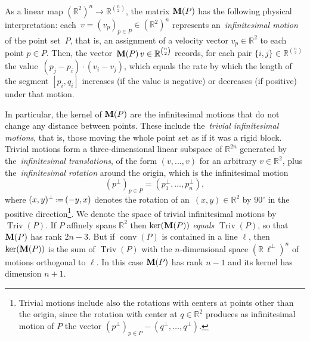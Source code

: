 \documentclass{amsart}
\theoremstyle{definition}
\newcommand{\R}{\mathbb{R}} %
\renewcommand{\b}[1]{{\boldsymbol{#1}}} %
\newcommand{\eqdef}{\mbox{\,\raisebox{0.2ex}{\scriptsize\ensuremath{\mathrm:}}\ensuremath{=}\,}} %
\DeclareMathOperator{\conv}{conv} %
\newcommand{\darkblue}{\color{darkblue}} %
\newcommand{\defn}[1]{\textsl{\darkblue #1}} %
\newcommand{\Mmatrix}{\b{\rm M}} %
\newcommand{\Triv}{\operatorname{Triv} } %
\begin{document}
As a linear map $(\R^2)^n\to \R^{\binom{n}{2}}$, the matrix $\Mmatrix(P)$ has the following physical interpretation: each~${v = (v_p)_{p\in P} \in (\R^2)^n}$ represents an~\defn{infinitesimal motion} of the point set~\(P\), that is, an assignment of a velocity vector \(v_p \in \R^2\) to each point \(p \in P\). Then, the vector~$\Mmatrix(P)\, v \in \R^{\binom{n}{2}}$ records, for each pair $\{i,j\} \in \R^{\binom{n}{2}}$ the value~$(p_j-p_i)\cdot (v_i-v_j)$, which equals the rate by which the length of the segment $[p_i,q_i]$ increases (if the value is negative) or decreases (if positive) under that motion.

In particular, the kernel of $\Mmatrix(P)$ are the infinitesimal motions that do not change any distance between points. 
These include the~\defn{trivial infinitesimal motions}, that is, those moving the whole point set as if it was a rigid block. Trivial motions form a three-dimensional linear subspace of $\R^{2n}$ generated by the~\defn{infinitesimal translations}, of the form $(v,...,v)$ for an arbitrary $v\in \R^2$, plus the~\defn{infinitesimal rotation} around the origin, which is the infinitesimal motion
\[
(p^\perp)_{p\in P} = (p_1^\perp, \dots, p_n^\perp),
\]
where $(x,y)^\perp\eqdef(-y,x)$ denotes the rotation of an~$(x,y)\in \R^2$ by \(90^{\circ}\) in the positive direction\footnote{Trivial motions include also the rotations with centers at points other than the origin, since the rotation with center at $q\in \R^2$ produces as infinitesimal motion of $P$ the vector $(p^\perp)_{p\in P} - (q^\perp,\dots,q^\perp)$.}.
We denote the space of trivial infinitesimal motions by $\Triv(P)$.
If $P$ affinely spans $\R^2$ then $\ker(\Mmatrix(P))$ \emph{equals} \(\Triv(P)\), so that $\Mmatrix(P)$ has rank $2n-3$.
But if $\conv(P)$ is contained in a line $\ell$, then $\ker(\Mmatrix(P))$ is the sum of \(\Triv(P)\) with the $n$-dimensional space $(\R\,\ell^\perp)^n$ of motions orthogonal to $\ell$. In this case $\Mmatrix(P)$ has rank $n-1$ and its kernel has dimension $n+1$.
\end{document}
